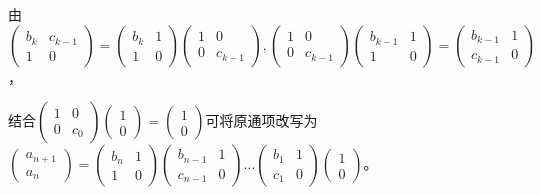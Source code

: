 \documentclass[a4paper,UTF8,fontset=windows]{ctexart}
\begin{document}
\begin{enumerate}
由$\begin{pmatrix}b_k&c_{k-1}\\1&0\end{pmatrix}=\begin{pmatrix}b_k&1\\1&0\end{pmatrix}\begin{pmatrix}1&0\\0&c_{k-1}\end{pmatrix},\begin{pmatrix}1&0\\0&c_{k-1}\end{pmatrix}\begin{pmatrix}b_{k-1}&1\\1&0\end{pmatrix}=\begin{pmatrix}b_{k-1}&1\\c_{k-1}&0\end{pmatrix}$，

结合$\begin{pmatrix}1&0\\0&c_0\end{pmatrix}\begin{pmatrix}1\\0\end{pmatrix}=\begin{pmatrix}1\\0\end{pmatrix}$可将原通项改写为$\begin{pmatrix}a_{n+1}\\a_n\end{pmatrix}=\begin{pmatrix}b_n&1\\1&0\end{pmatrix}\begin{pmatrix}b_{n-1}&1\\c_{n-1}&0\end{pmatrix}\dots\begin{pmatrix}b_1&1\\c_1&0\end{pmatrix}\begin{pmatrix}1\\0\end{pmatrix}$。


\end{enumerate}
\end{document}
